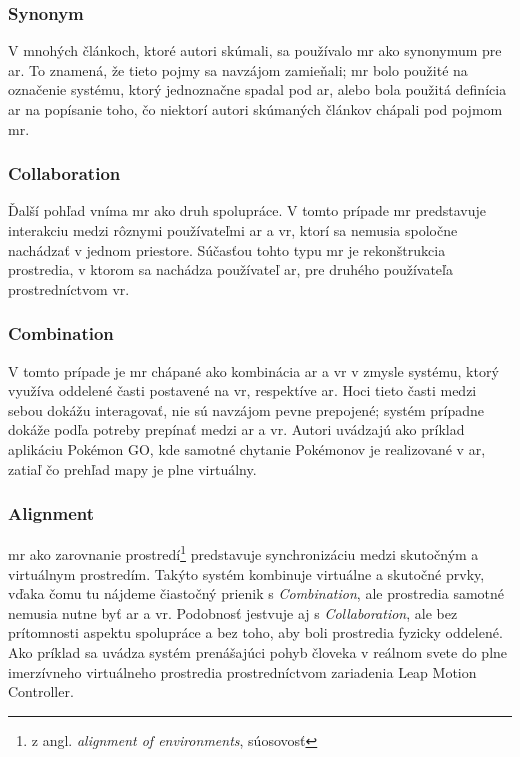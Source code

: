 \subsubsection{Synonym}
V mnohých článkoch, ktoré autori \cite{speicherWhatMixedReality2019a} skúmali, sa používalo \acrshort{mr} ako synonymum pre \acrshort{ar}. To znamená, že tieto pojmy sa 
navzájom zamieňali; \acrshort{mr} bolo použité na označenie systému, ktorý jednoznačne spadal pod \acrshort{ar}, alebo bola použitá definícia \acrshort{ar} na popísanie toho,
čo niektorí autori skúmaných článkov chápali pod pojmom \acrshort{mr}.

\subsubsection{Collaboration}
Ďalší pohľad vníma \acrshort{mr} ako druh spolupráce. V tomto prípade \acrshort{mr} predstavuje interakciu medzi rôznymi používateľmi \acrshort{ar} a \acrshort{vr}, ktorí
sa nemusia spoločne nachádzať v jednom priestore. Súčasťou tohto typu \acrshort{mr} je rekonštrukcia prostredia, v ktorom sa nachádza používateľ \acrshort{ar}, pre druhého
používateľa prostredníctvom \acrshort{vr}.

\subsubsection{Combination}
V tomto prípade je \acrshort{mr} chápané ako kombinácia \acrshort{ar} a \acrshort{vr} v zmysle systému, ktorý využíva oddelené časti postavené na \acrshort{vr}, respektíve
\acrshort{ar}. Hoci tieto časti medzi sebou dokážu interagovať, nie sú navzájom pevne prepojené; systém prípadne dokáže podľa potreby prepínať medzi \acrshort{ar} a
\acrshort{vr}. Autori \cite{speicherWhatMixedReality2019a} uvádzajú ako príklad aplikáciu Pokémon GO, kde samotné chytanie Pokémonov je realizované v \acrshort{ar}, zatiaľ čo 
prehľad mapy je plne virtuálny.

\subsubsection{Alignment}
\acrshort{mr} ako zarovnanie prostredí\footnote{z angl. \emph{alignment of environments}, súosovosť} predstavuje synchronizáciu medzi skutočným a virtuálnym prostredím.
Takýto systém kombinuje virtuálne a skutočné prvky, vďaka čomu tu nájdeme čiastočný prienik s \emph{Combination}, ale prostredia samotné nemusia nutne byť \acrshort{ar}
a \acrshort{vr}. Podobnosť jestvuje aj s \emph{Collaboration}, ale bez prítomnosti aspektu spolupráce a bez toho, aby boli prostredia fyzicky oddelené. Ako príklad sa 
uvádza systém prenášajúci pohyb človeka v reálnom svete do plne imerzívneho virtuálneho prostredia prostredníctvom zariadenia Leap Motion Controller.

